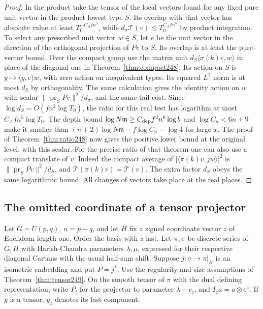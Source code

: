 \documentclass[a4paper,11pt]{article}
\theoremstyle{definition}
\theoremstyle{remark}
\numberwithin{equation}{section}
\begin{document}
\begin{proof}
In the product take the tensor of the local vectors found for any
fixed pure unit vector in the product lowest type \(S\). Its overlap
with that vector has absolute value at least \(T_0^{-C_A f n^5}\),
while \(d_\sigma\mathcal T(v)\le T_0^{C_A f n^5}\) by product
integration. To select any prescribed unit vector \(w\in S\), let
\(e\) be the unit vector in the direction of the orthogonal projection
of \(Pv\) to \(S\). Its overlap is at least the pure-vector bound.
Over the compact group use the matrix unit
\(d_S\overline{\langle\sigma(k)e,w\rangle}\) in place of the diagonal
one in Theorem~\ref{thm:compact248}. Its action on \(S\) is
\(y\mapsto\langle y,e\rangle w\), with zero action on inequivalent
types. Its squared \(L^1\) norm is at most \(d_S\) by orthogonality.
The same calculation gives the identity action on \(w\) with scalar
\(\|\operatorname{pr}_S Pv\|^2/d_\sigma\), and the same tail cost.
Since \(\log d_S=O(f n^2\log T_0)\), the ratio for this real test
has logarithm at most \(C_A f n^5\log T_0\). The depth bound
\(\log N\mathfrak m\ge C_{\rm dep} f^2n^6\log b\) and
\(\log C_n<6n+9\) make it smaller than
\((n+2)\log N\mathfrak m-f\log C_n-\log4\) for large \(x\).
The proof of Theorem~\ref{thm:ratio248} now gives the positive
lower bound at the original level, with this scalar. For the precise ratio of that theorem one can also use
a compact translate of \(v\). Indeed the compact average of
\(|\langle\pi(k)v,jw\rangle|^2\) is \(\|\operatorname{pr}_S Pv\|^2/d_S\),
and \(\mathcal T(\pi(k)v)=\mathcal T(v)\). The extra factor \(d_S\)
obeys the same logarithmic bound. All changes of vectors take place
at the real places.
\end{proof}

\subsection{The omitted coordinate of a tensor projector}\label{nav:IV-32}
Let \(G=U(p,q)\), \(n=p+q\), and let \(H\) fix a signed coordinate
vector \(z\) of Euclidean length one. Order the basis with \(z\) last.
Let \(\pi,\sigma\) be discrete series of \(G,H\) with Harish-Chandra
parameters \(\lambda,\mu\), expressed for their respective diagonal
Cartans with the usual half-sum shift. Suppose \(j:\sigma\to\pi|_H\)
is an isometric embedding and put \(P=j^*\). Use the regularity and
size assumptions of Theorem~\ref{thm:tensor249}. On the smooth tensor
of \(\pi\) with the dual defining representation, write \(P_i\) for
the projector to parameter \(\lambda-e_i\), and \(I_z a=a\otimes e^z\).
If \(y\) is a tensor, \(y_z\) denotes its last component.
\end{document}
